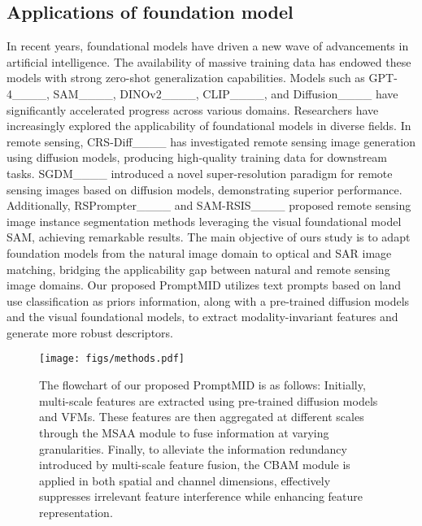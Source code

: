 \subsection{Applications of foundation model}
In recent years, foundational models have driven a new wave of advancements in artificial intelligence. The availability of massive training data has endowed these models with strong zero-shot generalization capabilities. Models such as GPT-4____, SAM____, DINOv2____, CLIP____, and Diffusion____ have significantly accelerated progress across various domains. Researchers have increasingly explored the applicability of foundational models in diverse fields. In remote sensing, CRS-Diff____ has investigated remote sensing image generation using diffusion models, producing high-quality training data for downstream tasks. SGDM____ introduced a novel super-resolution paradigm for remote sensing images based on diffusion models, demonstrating superior performance. Additionally, RSPrompter____ and SAM-RSIS____ proposed remote sensing image instance segmentation methods leveraging the visual foundational model SAM, achieving remarkable results. The main objective of ours study is to adapt foundation models from the natural image domain to optical and SAR image matching, bridging the applicability gap between natural and remote sensing image domains. Our proposed PromptMID utilizes text prompts based on land use classification as priors information, along with a pre-trained diffusion models and the visual foundational models, to extract modality-invariant features and generate more robust descriptors.

\begin{figure*}[!t]
	\centering
	\texttt{[image: figs/methods.pdf]}
	\caption{The flowchart of our proposed PromptMID is as follows: Initially, multi-scale features are extracted using pre-trained diffusion models and VFMs. These features are then aggregated at different scales through the MSAA module to fuse information at varying granularities. Finally, to alleviate the information redundancy introduced by multi-scale feature fusion, the CBAM module is applied in both spatial and channel dimensions, effectively suppresses irrelevant feature interference while enhancing feature representation.}
	\label{fig.all}
\end{figure*}